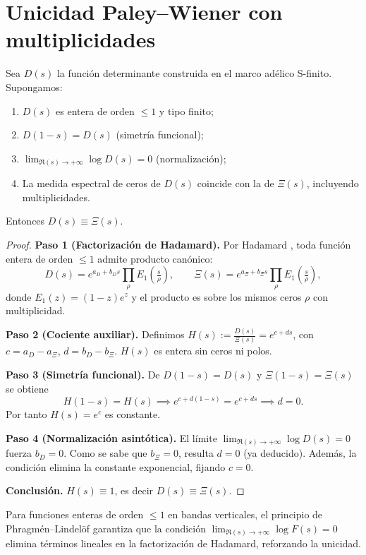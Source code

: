 \section{Unicidad Paley--Wiener con multiplicidades}

\begin{theorem}
\label{thm:paley-wiener-uniqueness}
Sea $D(s)$ la función determinante construida en el marco adélico S-finito. Supongamos:
\begin{enumerate}
\item $D(s)$ es entera de orden $\leq 1$ y tipo finito;
\item $D(1-s) = D(s)$ (simetría funcional);
\item $\lim_{\Re(s)\to+\infty} \log D(s) = 0$ (normalización);
\item La medida espectral de ceros de $D(s)$ coincide con la de $\Xi(s)$, 
incluyendo multiplicidades.
\end{enumerate}
Entonces $D(s) \equiv \Xi(s)$.
\end{theorem}

\begin{proof}
\textbf{Paso 1 (Factorización de Hadamard).}  
Por Hadamard \cite{hadamard1893}, toda función entera de orden $\leq 1$ admite producto canónico:
\[
D(s) = e^{a_D + b_D s} \prod_{\rho}\!E_1\!\left(\tfrac{s}{\rho}\right), 
\qquad 
\Xi(s) = e^{a_\Xi + b_\Xi s} \prod_{\rho}\!E_1\!\left(\tfrac{s}{\rho}\right),
\]
donde $E_1(z) = (1-z)e^z$ y el producto es sobre los mismos ceros $\rho$ con multiplicidad.

\textbf{Paso 2 (Cociente auxiliar).}  
Definimos $H(s) := \tfrac{D(s)}{\Xi(s)} = e^{c + ds}$, con $c=a_D-a_\Xi$, $d=b_D-b_\Xi$.  
$H(s)$ es entera sin ceros ni polos.

\textbf{Paso 3 (Simetría funcional).}  
De $D(1-s)=D(s)$ y $\Xi(1-s)=\Xi(s)$ se obtiene
\[
H(1-s) = H(s) \implies e^{c+d(1-s)} = e^{c+ds} \implies d=0.
\]
Por tanto $H(s)=e^c$ es constante.

\textbf{Paso 4 (Normalización asintótica).}  
El límite $\lim_{\Re(s)\to+\infty} \log D(s)=0$ fuerza $b_D=0$. Como se sabe que $b_\Xi=0$, resulta $d=0$ (ya deducido). Además, la condición elimina la constante exponencial, fijando $c=0$.

\textbf{Conclusión.}  
$H(s)\equiv 1$, es decir $D(s)\equiv \Xi(s)$.
\end{proof}

\begin{lemma}\label{lem:phragmen}
Para funciones enteras de orden $\leq 1$ en bandas verticales, el principio de Phragmén–Lindelöf \cite{phragmen1908} garantiza que la condición $\lim_{\Re(s)\to+\infty}\log F(s)=0$ elimina términos lineales en la factorización de Hadamard, reforzando la unicidad.
\end{lemma}


